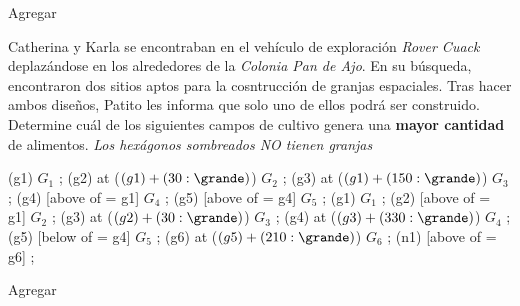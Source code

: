 \begin{solgrupal}
Agregar
\end{solgrupal}


\begin{probgrupal}{}{}{}

Catherina y Karla se encontraban en el vehículo de exploración \emph{Rover Cuack} deplazándose en los alrededores de la \emph{Colonia Pan de Ajo}. %
En su búsqueda, encontraron dos sitios aptos para la cosntrucción de granjas espaciales. Tras hacer ambos diseños, Patito les informa que solo uno de %
ellos podrá ser construido. Determine cuál de los siguientes campos de cultivo genera una \textbf{mayor cantidad} de alimentos. \emph{Los hexágonos sombreados %
NO tienen granjas}

\begin{center}
\cultivos
\granja (g1) {$G_1$} ;
\granja (g2) at ($(g1) + (30:\grande)$) {$G_2$} ;
\granja (g3) at ($(g1) + (150:\grande)$) {$G_3$} ;
\granja (g4) [above of = g1] {$G_4$} ;
\granja (g5) [above of = g4] {$G_5$} ;
\finfin
\hspace{20mm}
\cultivos
\granja (g1) {$G_1$} ;
\granja (g2) [above of = g1] {$G_2$} ;
\granja (g3) at ($(g2) + (30:\grande)$) {$G_3$} ;
\granja (g4) at ($(g3) + (330:\grande)$) {$G_4$} ;
\granja (g5) [below of = g4] {$G_5$} ;
\granja (g6) at ($(g5) + (210:\grande)$) {$G_6$} ;
\granjaN (n1) [above of = g6] {} ;
\finfin
\end{center}
\end{probgrupal}

\begin{solgrupal}
Agregar
\end{solgrupal}


